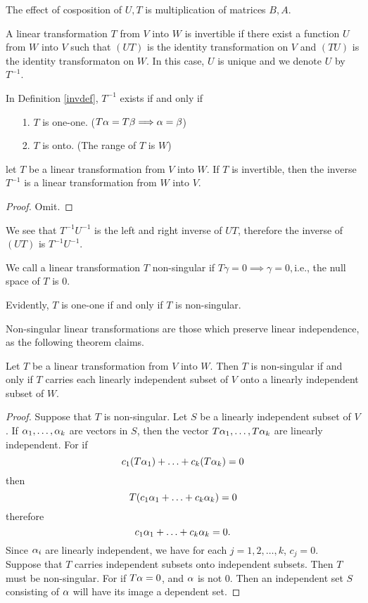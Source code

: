 \documentclass{mynotes}
\begin{document}
\begin{remark}
The effect of cosposition of $U,T$ is multiplication of matrices $B,A$.
\end{remark}
\begin{definition}[invertible]\label{invdef}
A linear transformation $T$ from $V$ into $W$ is invertible if there exist a function $U$ from $W$ into $V$ such that $(UT)$ is the identity transformation on $V$ and $(TU)$ is the identity transformaton on $W$. In this case, $U$ is unique and we denote $U$ by $T^{-1}$.
\end{definition}
\begin{remark}
In Definition \ref{invdef}, $T^{-1}$ exists if and only if
\begin{itemize}
	\item[1.] $T$ is one-one. ($T\alpha=T\beta\Longrightarrow \alpha=\beta$)
	\item[2.] $T$ is onto. (The range of $T$ is $W$)
\end{itemize}
\end{remark}
\begin{theorem}
let $T$ be a linear transformation from $V$ into $W$. If $T$ is invertible, then the inverse $T^{-1}$ is a linear transformation from $W$ into $V$.
\end{theorem}
\begin{proof}
Omit.
\end{proof}
\begin{remark}
We see that $T^{-1}U^{-1}$ is the left and right inverse of $UT$, therefore the inverse of $(UT)$ is $T^{-1}U^{-1}$.
\end{remark}
\begin{definition}
We call a linear transformation $T$ non-singular if $T\gamma=0\implies\gamma=0,$i.e., the null space of $T$ is $0$.
\end{definition}
\begin{remark}
Evidently, $T$ is one-one if and only if $T$ is non-singular.
\end{remark}
\begin{remark}
 Non-singular linear transformations are those which preserve linear independence, as the following theorem claims.
\end{remark}
\begin{theorem}
Let $T$ be a linear transformation from $V$ into $W$. Then $T$ is non-singular if and only if $T$ carries each linearly independent subset of $V$ onto a linearly independent subset of $W$.
\end{theorem}
\begin{proof}
Suppose that $T$ is non-singular. Let $S$ be a linearly independent subset of $V$. If $\alpha_1,\ldots,\alpha_k$ are vectors in $S$, then the vector $T\alpha_1,\ldots,T\alpha_k$ are linearly independent. For if $$c_1(T\alpha_1)+\ldots+c_k(T\alpha_k)=0$$then $$T(c_1\alpha_1+\ldots+c_k\alpha_k) = 0$$therefore $$c_1\alpha_1+\ldots+c_k\alpha_k = 0.$$Since $\alpha_i$ are linearly independent, we have for each $j=1,2,\ldots,k$, $c_j = 0$.\\
Suppose that $T$ carries independent subsets onto independent subsets. Then $T$ must be non-singular. For if $T\alpha=0$, and $\alpha$ is not $0$. Then an independent set $S$ consisting of $\alpha$ will have its image a dependent set.
\end{proof}
\end{document}
